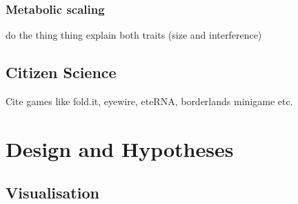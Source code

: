 \subsubsection{Metabolic scaling}
do the thing thing
explain both traits (size and interference)

\subsection{Citizen Science}
Cite games like fold.it, eyewire, eteRNA, borderlands minigame etc.

\section{Design and Hypotheses}
\subsection{Visualisation}
\label{sec:eco_visualisation}
